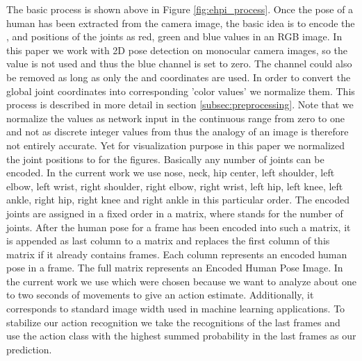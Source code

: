 \documentclass[a4paper, 10pt, conference]{ieeeconf}
\begin{document}
\begin{minipage}{\textwidth}
The basic process is shown above in Figure \ref{fig:ehpi_process}. Once the pose of a human has been extracted from the camera image, the basic idea is to encode the ,  and  positions of the joints as red, green and blue values in an RGB image. In this paper we work with 2D pose detection on monocular camera images, so the  value is not used and thus the blue channel is set to zero. The channel could also be removed as long as only the  and  coordinates are used. In order to convert the global joint coordinates into corresponding 'color values' we normalize them. This process is described in more detail in section \ref{subsec:preprocessing}. Note that we normalize the values as network input in the continuous range from zero to one and not as discrete integer values from  thus the analogy of an image is therefore not entirely accurate. Yet for visualization purpose in this paper we normalized the joint positions to  for the figures. Basically any number of joints can be encoded. In the current work we use nose, neck, hip center, left shoulder, left elbow, left wrist, right shoulder, right elbow, right wrist, left hip, left knee, left ankle, right hip, right knee and right ankle in this particular order. The encoded joints are assigned in a fixed order in a  matrix, where  stands for the number of joints. After the human pose for a frame has been encoded into such a matrix, it is appended as last column to a  matrix and replaces the first column of this matrix if it already contains  frames. Each column represents an encoded human pose in a frame. The full matrix represents an Encoded Human Pose Image. In the current work we use  which were chosen because we want to analyze about one to two seconds of movements to give an action estimate. Additionally, it corresponds to standard image width used in machine learning applications. To stabilize our action recognition we take the recognitions of the last  frames and use the action class with the highest summed probability in the last  frames as our prediction.


\end{minipage}
\end{document}
